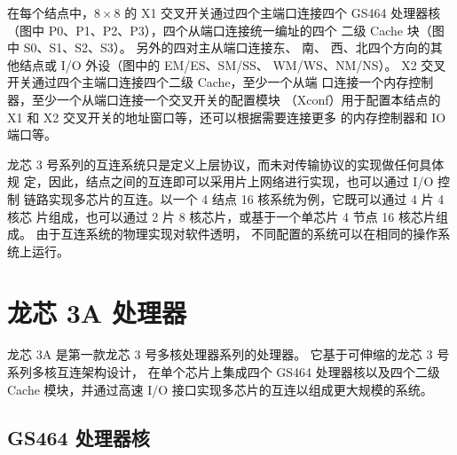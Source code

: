 在每个结点中，$8\times8$ 的 X1 交叉开关通过四个主端口连接四个 GS464
处理器核（图中 P0、P1、P2、P3），四个从端口连接统一编址的四个
二级 Cache 块（图中 S0、S1、S2、S3）。 另外的四对主从端口连接东、 南、
西、北四个方向的其他结点或 I/O 外设（图中的 EM/ES、SM/SS、 WM/WS、NM/NS）。
X2 交叉开关通过四个主端口连接四个二级 Cache，至少一个从端
口连接一个内存控制器，至少一个从端口连接一个交叉开关的配置模块
（Xconf）用于配置本结点的 X1 和 X2 交叉开关的地址窗口等，还可以根据需要连接更多
的内存控制器和 IO 端口等。

龙芯 3 号系列的互连系统只是定义上层协议，而未对传输协议的实现做任何具体规
定，因此，结点之间的互连即可以采用片上网络进行实现，也可以通过 I/O 控制
链路实现多芯片的互连。以一个 4 结点 16 核系统为例，它既可以通过 4 片 4 核芯
片组成，也可以通过 2 片 8 核芯片，或基于一个单芯片 4 节点 16 核芯片组成。
由于互连系统的物理实现对软件透明， 不同配置的系统可以在相同的操作系统上运行。

\section{龙芯 3A 处理器}

龙芯 3A 是第一款龙芯 3 号多核处理器系列的处理器。 它基于可伸缩的龙芯 3
号系列多核互连架构设计， 在单个芯片上集成四个 GS464 处理器核以及四个二级 Cache
模块，并通过高速 I/O 接口实现多芯片的互连以组成更大规模的系统。

\subsection{GS464 处理器核}


